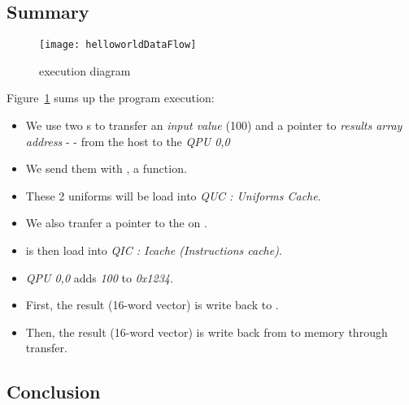 \subsection{Summary}

\begin{figure}[!htbp]
	\centering
	\texttt{[image: helloworldDataFlow]}
	\caption{ execution diagram}
	\label{flowFigure}
\end{figure}
\FloatBarrier


Figure~\ref{flowFigure} sums up the  program execution:

\begin{itemize}
	\item We use two \uni{}s to transfer an \emph{input value} (100) and a pointer to \emph{results array address} -  - from the host \cpu{} to the \emph{QPU 0,0}
	\item We send them with , a \mail{} function.
	\item These 2 uniforms will be load into \emph{QUC : Uniforms Cache}.
	\item We also tranfer a pointer to the  on .
	\item {} is then load into \emph{QIC : Icache (Instructions cache)}.
	\item \emph{QPU 0,0} adds \emph{100} to \emph{0x1234}.
	\item First, the result (16-word vector) is write back to .
	\item Then, the result (16-word vector) is write back from  to \ram{} memory through  transfer.
\end{itemize}


\subsection{Conclusion}\label{GPUconclusion}

